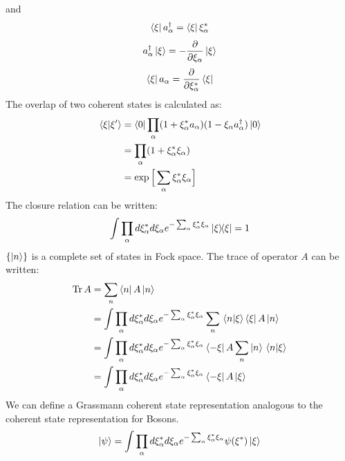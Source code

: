 \documentclass[12pt]{article}
\begin{document}
and
\begin{equation*}
    \bra{\xi}a^\dagger_\alpha=\bra{\xi}\xi^*_\alpha
\end{equation*}
\begin{equation*}
    a^\dagger_\alpha\ket{\xi}=-\frac{\partial}{\partial\xi_\alpha}\ket{\xi}
\end{equation*}
\begin{equation*}
    \bra{\xi}a_\alpha=\frac{\partial}{\partial\xi^*_\alpha}\bra{\xi}
\end{equation*}
The overlap of two coherent states is calculated as:
\begin{equation*}
    \begin{split}
        \braket*{\xi}{\xi'}&=\bra{0}\prod_\alpha(1+\xi^*_\alpha a_\alpha)
        (1-\xi_\alpha a_\alpha^\dagger)\ket{0}\\
        &=\prod_\alpha(1+\xi_\alpha^*\xi_\alpha)\\
        &=\exp\Big[\sum_\alpha\xi^*_\alpha\xi_\alpha\Big]
    \end{split}
\end{equation*}
The closure relation can be written:
\begin{equation*}
    \int\prod_\alpha d\xi^*_\alpha d\xi_\alpha e^{-\sum_\alpha\xi^*_\alpha\xi_\alpha}
    \ketbra*{\xi}{\xi}=1
\end{equation*}
$\{\ket{n}\}$ is a complete set of states in Fock space. The trace of operator $A$ can 
be written:
\begin{equation*}
    \begin{split}
        \Tr A&=\sum_n\bra{n}A\ket{n}\\
        &=\int\prod_\alpha d\xi^*_\alpha d\xi_\alpha 
        e^{-\sum_\alpha\xi^*_\alpha\xi_\alpha}\sum_n\braket*{n}{\xi}\bra{\xi}A\ket{n}\\
        &=\int\prod_\alpha d\xi^*_\alpha d\xi_\alpha
        e^{-\sum_\alpha\xi^*_\alpha\xi_\alpha}\bra{-\xi}A\sum_n\ket{n}\braket*{n}{\xi}\\
        &=\int\prod_\alpha d\xi^*_\alpha d\xi_\alpha 
        e^{-\sum_\alpha\xi^*_\alpha\xi_\alpha}\bra{-\xi}A\ket{\xi}
    \end{split}
\end{equation*}
We can define a Grassmann coherent state representation analogous to the coherent state 
representation for Bosons.
\begin{equation*}
    \ket{\psi}=\int\prod_\alpha d\xi^*_\alpha d\xi_\alpha 
    e^{-\sum_\alpha\xi^*_\alpha\xi_\alpha}\psi(\xi^*)\ket{\xi}
\end{equation*} 
\end{document}
